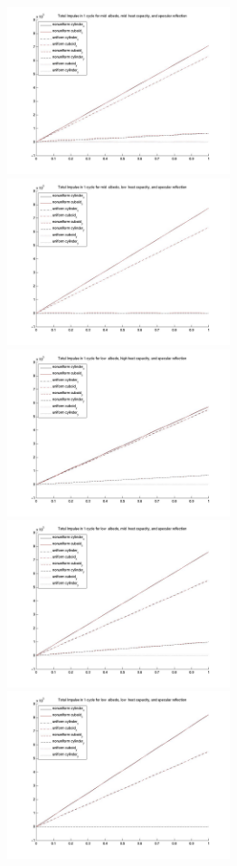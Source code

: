 \begin{description}
\begin{figure}[!ht]
\begin{minipage}[t]{200mm}
     \includegraphics[width=65mm]{figs/Plate_mod/I_alb_mid__HC_mid__ref_spc.jpg}
     \includegraphics[width=65mm]{figs/Plate_mod/I_alb_mid__HC_low__ref_spc.jpg}
     \includegraphics[width=65mm]{figs/Plate_mod/I_alb_low__HC_high_ref_spc.jpg}
     \includegraphics[width=65mm]{figs/Plate_mod/I_alb_low__HC_mid__ref_spc.jpg}
     \includegraphics[width=65mm]{figs/Plate_mod/I_alb_low__HC_low__ref_spc.jpg}

\end{minipage}
\end{figure}
\end{description}
